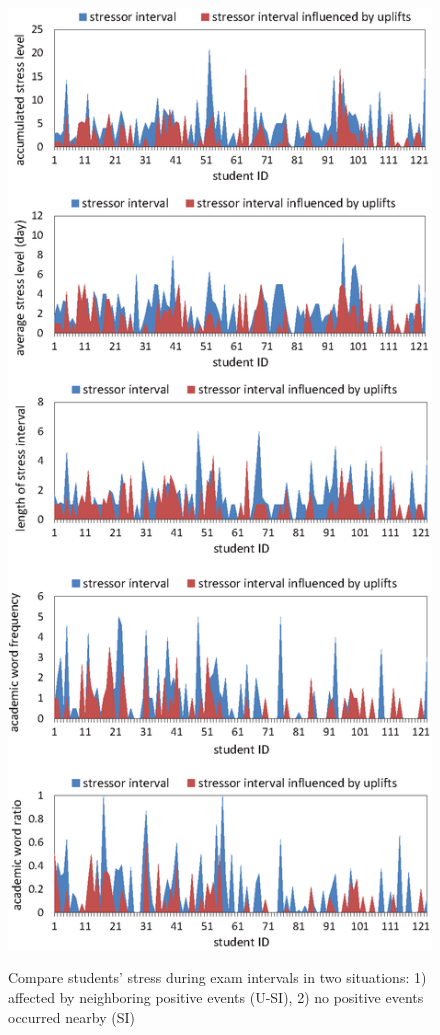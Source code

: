 \begin{figure}
\centering
\caption{Compare students' stress during exam intervals in two situations:
1) affected by neighboring positive events (U-SI), 2) no positive events occurred nearby (SI)}
\includegraphics[width=0.85\linewidth]{figs/frequency.eps}
\label{fig:frequency}
\end{figure}

